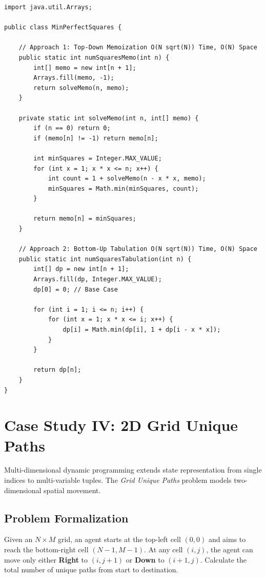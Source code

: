 \documentclass[10pt,journal,compsoc,onecolumn]{IEEEtran}
\begin{document}
\begin{verbatim}
import java.util.Arrays;

public class MinPerfectSquares {

    // Approach 1: Top-Down Memoization O(N sqrt(N)) Time, O(N) Space
    public static int numSquaresMemo(int n) {
        int[] memo = new int[n + 1];
        Arrays.fill(memo, -1);
        return solveMemo(n, memo);
    }

    private static int solveMemo(int n, int[] memo) {
        if (n == 0) return 0;
        if (memo[n] != -1) return memo[n];

        int minSquares = Integer.MAX_VALUE;
        for (int x = 1; x * x <= n; x++) {
            int count = 1 + solveMemo(n - x * x, memo);
            minSquares = Math.min(minSquares, count);
        }

        return memo[n] = minSquares;
    }

    // Approach 2: Bottom-Up Tabulation O(N sqrt(N)) Time, O(N) Space
    public static int numSquaresTabulation(int n) {
        int[] dp = new int[n + 1];
        Arrays.fill(dp, Integer.MAX_VALUE);
        dp[0] = 0; // Base Case

        for (int i = 1; i <= n; i++) {
            for (int x = 1; x * x <= i; x++) {
                dp[i] = Math.min(dp[i], 1 + dp[i - x * x]);
            }
        }

        return dp[n];
    }
}
\end{verbatim}


\section{Case Study IV: 2D Grid Unique Paths}
\label{sec:grid-paths}

Multi-dimensional dynamic programming extends state representation from single indices to multi-variable tuples. The \emph{Grid Unique Paths} problem models two-dimensional spatial movement.

\subsection{Problem Formalization}

Given an $N \times M$ grid, an agent starts at the top-left cell $(0, 0)$ and aims to reach the bottom-right cell $(N-1, M-1)$. At any cell $(i, j)$, the agent can move only either \textbf{Right} to $(i, j+1)$ or \textbf{Down} to $(i+1, j)$. Calculate the total number of unique paths from start to destination.
\end{document}
